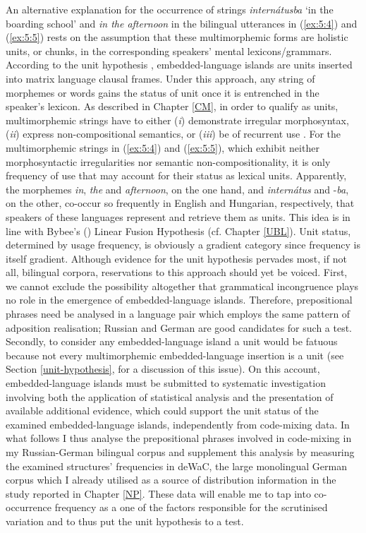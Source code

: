 An alternative explanation for the occurrence of strings \textit{internátusba} `in the boarding school' and \textit{in the afternoon} in the bilingual utterances in (\ref{ex:5:4}) and (\ref{ex:5:5}) rests on the assumption that these multimorphemic forms are holistic units, or chunks, in the corresponding speakers' mental lexicons/grammars. According to the unit hypothesis \citep{backus-evidence-1999,backus-units-2003}, embedded-language islands are units inserted into matrix language clausal frames. Under this approach, any string of morphemes or words gains the status of unit once it is entrenched in the speaker's lexicon. As described in Chapter \ref{CM}, in order to qualify as units, multimorphemic strings have to either (\textit{i}) demonstrate irregular morphosyntax, (\textit{ii}) express non-compositional semantics, or (\textit{iii}) be of recurrent use \citep[90]{backus-units-2003}. For the multimorphemic strings in (\ref{ex:5:4}) and (\ref{ex:5:5}), which exhibit neither morphosyntactic irregularities nor semantic non-compositionality, it is only frequency of use that may account for their status as lexical units. Apparently, the morphemes \textit{in}, \textit{the} and \textit{afternoon}, on the one hand, and \textit{internátus} and -\textit{ba}, on the other, co-occur so frequently in English and Hungarian, respectively, that speakers of these languages represent and retrieve them as units. This idea is in line with Bybee's (\citeyear{bybee-constituency-2002}) Linear Fusion Hypothesis (cf. Chapter \ref{UBL}). Unit status, determined by usage frequency, is obviously a gradient category since frequency is itself gradient. Although evidence for the unit hypothesis pervades most, if not all, bilingual corpora, reservations to this approach should yet be voiced. First, we cannot exclude the possibility altogether that grammatical incongruence plays no role in the emergence of embedded-language islands. Therefore, prepositional phrases need be analysed in a language pair which employs the same pattern of adposition realisation; Russian and German are good candidates for such a test. Secondly, to consider any embedded-language island a unit would be fatuous because not every multimorphemic embedded-language insertion is a unit (see Section \ref{unit-hypothesis}, for a discussion of this issue). On this account, embedded-language islands must be submitted to systematic investigation involving both the application of statistical analysis and the presentation of available additional evidence, which could support the unit status of the examined embedded-language islands, independently from code-mixing data. In what follows I thus analyse the prepositional phrases involved in code-mixing in my Russian-German bilingual corpus and supplement this analysis by measuring the  examined structures’ frequencies in deWaC, the large monolingual German corpus \citep{baroni2006} which I already utilised as a source of distribution information in the study reported in Chapter \ref{NP}. These data will enable me to tap into co-occurrence frequency as a one of the factors responsible for the scrutinised variation and to thus put the unit hypothesis to a test.

